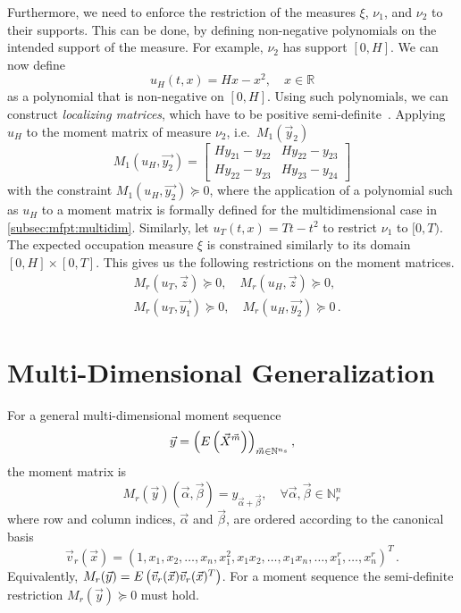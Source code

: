 Furthermore, we need to enforce the restriction of the measures $\xi$, $\nu_1$, and $\nu_2$
to their supports.
This can be done, by defining non-negative polynomials
on the intended support of the measure.
For example, $\nu_2$ has support $[0,H]$. We can now define
$$
u_H(t,x) = Hx - x^2, \quad x\in \mathbb R
$$
as a polynomial that is non-negative on $[0,H]$.
Using such polynomials, we can construct \emph{localizing matrices},
which have to be positive semi-definite~\cite{lasserre2010moments}.
Applying $u_H$ to the moment matrix of measure $\nu_2$, i.e.\ $M_1(\vec{y}_2)$
$$
M_1(u_H, \vec{y_2})=
\begin{bmatrix}
    Hy_{21} - y_{22} & Hy_{22} - y_{23} \\
    Hy_{22} - y_{23} & Hy_{23} - y_{24}
\end{bmatrix}
$$
with the constraint $M_1(u_H, \vec{y_2})\succeq 0$, where the application of
a polynomial such as $u_H$ to a moment matrix
is formally defined for the multidimensional case in \autoref{subsec:mfpt:multidim}.
Similarly, let $u_T(t, x) = Tt-t^2$ to restrict $\nu_1$ to $[0,T)$.
The expected occupation measure $\xi$ is constrained similarly to its domain
$[0,H]\times[0,T]$.
This gives us the following restrictions on the moment matrices.
\begin{equation}\label{eq:localizing_sd_constraints}
\begin{split}
&M_r(u_T,\vec{z})\succeq 0, \quad M_r(u_H,\vec{z})\succeq 0,\\
&M_r(u_T,\vec{y_1})\succeq 0,\quad M_r(u_H,\vec{y_2})\succeq 0\,.
\end{split}
\end{equation}

\section{Multi-Dimensional Generalization}
\label{subsec:mfpt:multidim}
For a general multi-dimensional moment sequence
$$\vec{y}={\left({E}\left(\vec X^{\vec{m}}\right)\right)}_{\vec{m}\in\mathbb{N}^{n_s}}\,,$$ the moment
matrix is~\cite{lasserre2010moments}
$$M_r(\vec y)(\vec\alpha,\vec\beta)
=y_{\vec\alpha + \vec\beta},\quad\forall\vec{\alpha},
\vec{\beta}\in\mathbb{N}_r^n$$
where row and column indices, $\vec{\alpha}$ and $\vec\beta$, are ordered according to the canonical basis
\begin{equation}\label{eq:canoncial_basis}
\vec{v}_r(\vec{x}) =
{(1,x_1,x_2,\dots,x_n,x_1^2,x_1x_2,\dots ,x_1x_n,\dots ,x_1^r,\dots
	,x_n^r)}^T\,.
\end{equation}
Equivalently, $M_r(\vec{y})={E}\left(\vec{v}_r (\vec x)\vec{v}_r(\vec x)^T\right)$.
For a moment sequence the semi-definite restriction $M_r(\vec{y})\succeq 0$ must hold.

